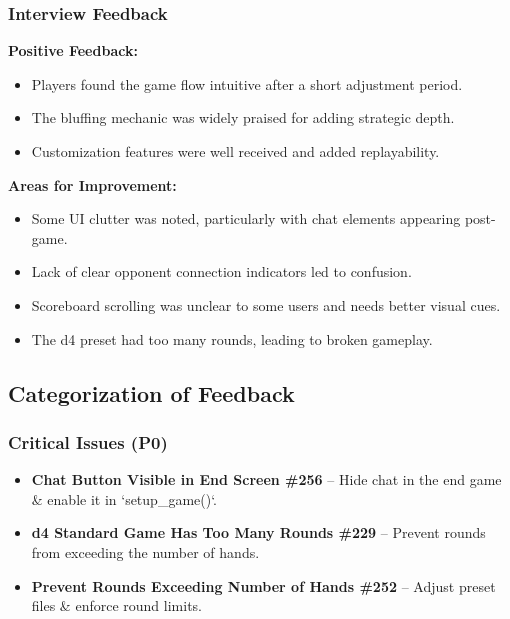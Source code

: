 \documentclass{article}
\begin{document}
\subsubsection{Interview Feedback}

\textbf{Positive Feedback:}
\begin{itemize}
    \item Players found the game flow intuitive after a short adjustment period.
    \item The bluffing mechanic was widely praised for adding strategic depth.
    \item Customization features were well received and added replayability.
\end{itemize}

\textbf{Areas for Improvement:}
\begin{itemize}
    \item Some UI clutter was noted, particularly with chat elements appearing post-game.
    \item Lack of clear opponent connection indicators led to confusion.
    \item Scoreboard scrolling was unclear to some users and needs better visual cues.
    \item The d4 preset had too many rounds, leading to broken gameplay.
\end{itemize}


\subsection{Categorization of Feedback}

\subsubsection{Critical Issues (P0)}
\begin{itemize}
    \item \textbf{Chat Button Visible in End Screen \#256} – Hide chat in the end game \& enable it in `setup\_game()`.
    \item \textbf{d4 Standard Game Has Too Many Rounds \#229} – Prevent rounds from exceeding the number of hands.
    \item \textbf{Prevent Rounds Exceeding Number of Hands \#252} – Adjust preset files \& enforce round limits.
\end{itemize}
\end{document}
